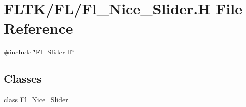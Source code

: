 \hypertarget{_fl___nice___slider_8_h}{}\section{F\+L\+T\+K/\+F\+L/\+Fl\+\_\+\+Nice\+\_\+\+Slider.H File Reference}
\label{_fl___nice___slider_8_h}
{\ttfamily \#include \char`\"{}Fl\+\_\+\+Slider.\+H\char`\"{}}\newline
\subsection*{Classes}
\begin{DoxyCompactItemize}
\item 
class \hyperlink{class_fl___nice___slider}{Fl\+\_\+\+Nice\+\_\+\+Slider}
\end{DoxyCompactItemize}
